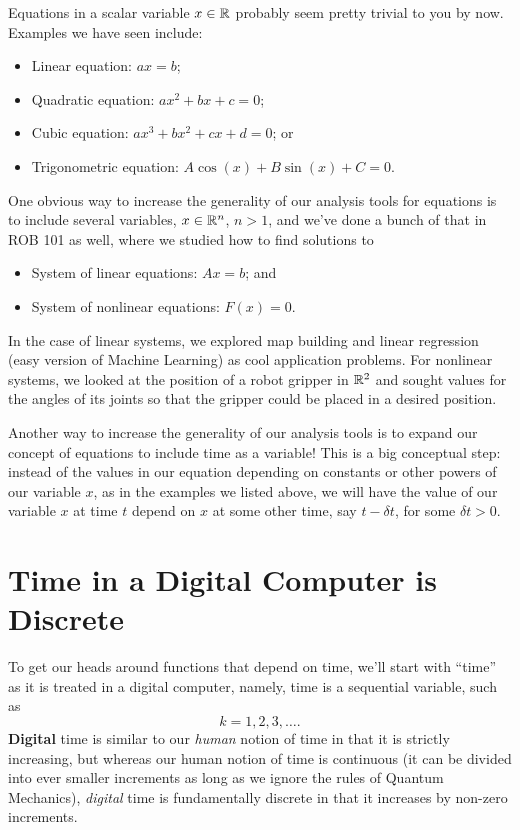 Equations in a scalar variable $x \in \mathbb R$ probably seem pretty trivial to you by now. Examples we have seen include:
\begin{itemize}
    \item Linear equation: $ax=b$;
    \item Quadratic equation: $ax^2 + bx + c=0$;
     \item Cubic equation: $ax^3 + bx^2 + cx + d=0$; or
    \item Trigonometric equation: $A \cos(x) + B \sin(x) + C=0$.
\end{itemize}

One obvious way to increase the generality of our analysis tools for equations is to include several variables, $x\in \mathbb R^n$, $n > 1$, and we've done a bunch of that in ROB 101 as well, where we studied how to find solutions to
\begin{itemize}
    \item System of linear equations: $Ax=b$; and
    \item System of nonlinear equations: $F(x)=0$.
\end{itemize}
In the case of linear systems, we explored map building and linear regression (easy version of Machine Learning) as cool application problems. For nonlinear systems, we looked at the position of a robot gripper in $\mathbb R^2$ and sought values for the angles of its joints so that the gripper could be placed in a desired position. \\
\begin{tcolorbox}
Another way to increase the generality of our analysis tools is to expand our concept of equations to include time as a variable! This is a big conceptual step: instead of the values in our equation depending on constants or other powers of our variable $x$, as in the examples we listed above, we will have the value of our variable $x$ at time $t$ depend on $x$ at some other time, say $t-\delta t$, for some $\delta t>0$. 
\end{tcolorbox}

\section{Time in a Digital Computer is Discrete}

To get our heads around functions that depend on time, we'll start with ``time'' as it is treated in a digital computer, namely, time is a sequential variable, such as 
\begin{equation}
    \label{eq:SeqTime}
    k= 1, 2, 3, \ldots. 
\end{equation}
\textbf{Digital} time is similar to our \textit{human} notion of time in that it is strictly increasing, but whereas our human notion of time is continuous (it can be divided into ever smaller increments as long as we ignore the rules of Quantum Mechanics), \textit{digital} time is fundamentally discrete in that it increases by non-zero increments.  \\

